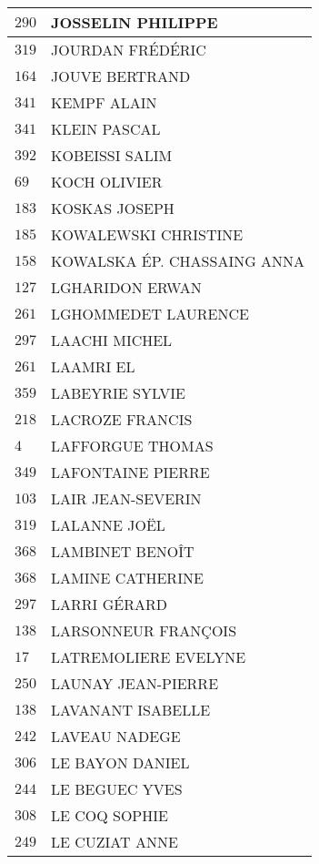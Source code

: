 \begin{xltabular}{\linewidth}{|l|X|}
    \hline
    $290$ & JOSSELIN PHILIPPE \\
    \hline
    $319$ & JOURDAN FRÉDÉRIC \\
    \hline
    $164$ & JOUVE BERTRAND \\
    \hline
    $341$ & KEMPF ALAIN \\
    \hline
    $341$ & KLEIN PASCAL \\
    \hline
    $392$ & KOBEISSI SALIM \\
    \hline
    $69$ & KOCH OLIVIER \\
    \hline
    $183$ & KOSKAS JOSEPH \\
    \hline
    $185$ & KOWALEWSKI CHRISTINE \\
    \hline
    $158$ & KOWALSKA ÉP. CHASSAING ANNA \\
    \hline
    $127$ & LGHARIDON ERWAN \\
    \hline
    $261$ & LGHOMMEDET LAURENCE \\
    \hline
    $297$ & LAACHI MICHEL \\
    \hline
    $261$ & LAAMRI EL \\
    \hline
    $359$ & LABEYRIE SYLVIE \\
    \hline
    $218$ & LACROZE FRANCIS \\
    \hline
    $4$ & LAFFORGUE THOMAS \\
    \hline
    $349$ & LAFONTAINE PIERRE \\
    \hline
    $103$ & LAIR JEAN-SEVERIN \\
    \hline
    $319$ & LALANNE JOËL \\
    \hline
    $368$ & LAMBINET BENOÎT \\
    \hline
    $368$ & LAMINE CATHERINE \\
    \hline
    $297$ & LARRI GÉRARD \\
    \hline
    $138$ & LARSONNEUR FRANÇOIS \\
    \hline
    $17$ & LATREMOLIERE EVELYNE \\
    \hline
    $250$ & LAUNAY JEAN-PIERRE \\
    \hline
    $138$ & LAVANANT ISABELLE \\
    \hline
    $242$ & LAVEAU NADEGE \\
    \hline
    $306$ & LE BAYON DANIEL \\
    \hline
    $244$ & LE BEGUEC YVES \\
    \hline
    $308$ & LE COQ SOPHIE \\
    \hline
    $249$ & LE CUZIAT ANNE \\

\end{xltabular}
